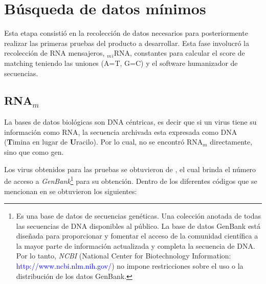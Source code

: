 \documentclass[12pt,a4paper,spanish]{article}
\begin{document}
\section{Búsqueda de datos mínimos}
	\par Esta etapa consistió en la recolección de datos necesarios para posteriormente realizar las primeras pruebas del 		producto a desarrollar. Esta fase involucró la recolección de RNA mensajeros, $_m$$_i$RNA, constantes para calcular el 		score de matching teniendo las uniones (A=T, G=C) y el software humanizador de secuencias.

	\subsection{RNA$_m$}
		\par La bases de datos biológicas son DNA céntricas, es decir que si un virus tiene su información como RNA, la 		secuencia archivada esta expresada como DNA (\textbf{T}imina en lugar de \textbf{U}racilo). Por lo cual, no se 			encontró RNA$_m$ directamente, sino que como gen.

		\par Los virus obtenidos para las pruebas se obtuvieron de \cite{holmes}, el cual brinda el número de acceso a 			\textit{GenBank}\footnote{Es una base de datos de secuencias genéticas. Una colección anotada de todas las 			secuencias de DNA disponibles al público. La base de datos GenBank está diseñada para proporcionar y fomentar el 			acceso de la comunidad científica a la mayor parte de información actualizada y completa la secuencia de DNA. Por 			lo tanto, \textit{NCBI} (National Center for Biotechnology Information:
		\textcolor{blue}{http://www.ncbi.nlm.nih.gov/}) no impone restricciones sobre el uso o la distribución de los 			datos GenBank.} para su obtención. Dentro de los diferentes códigos que se mencionan en \cite{holmes} se 			obtuvieron los siguientes:
\end{document}
